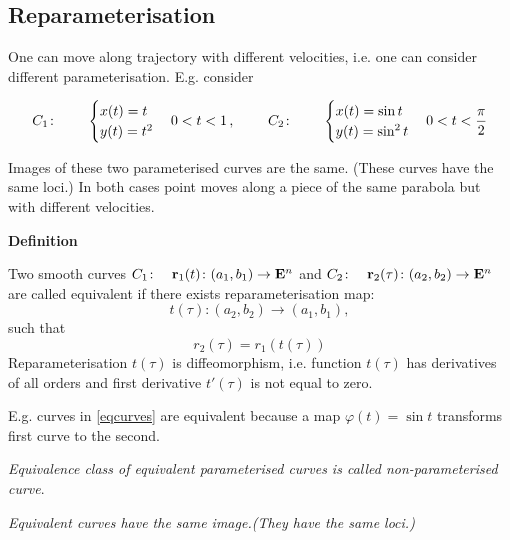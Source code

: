 \documentclass[12pt]{article}
\numberwithin{equation}{section}
\begin{document}
 \subsection {Reparameterisation}

  One can move along trajectory  with different velocities, i.e.
  one can consider different parameterisation. E.g. consider

\begin{equation*}\label{eqcurves}
    C_1\colon\qquad
  \begin{cases}
  x(t)=t\\
  y(t)=t^2\\
  \end{cases}
  0<t<1\,,
 \qquad\
  C_2\colon\qquad
 \begin{cases}
  x(t)=\sin t\\
  y(t)=\sin^2 t\\
  \end{cases}
    0<t<{\pi\over 2}
\end{equation*}

Images of these two  parameterised curves are the same. 
  (These curves have the same loci.)
In both cases point moves
along a piece of the same parabola but with different velocities.

\medskip

{\bf Definition}

  Two smooth curves
  $C_1\colon\quad {\bf r}_1(t)\colon (a_1,b_1)\rightarrow {\bf E}^n$ and
  $C_2\colon\quad {\bf r}_2(\tau)\colon (a_2,b_2)\rightarrow {\bf E}^n$
      are called equivalent if there exists
      reparameterisation map:
                            $$
             t(\tau)\colon (a_2,b_2)\rightarrow (a_1,b_1),
                        $$
                     such that
\begin{equation}\label{repardef}
     r_2(\tau)=r_1(t(\tau))
\end{equation}
Reparameterisation $t(\tau)$ is diffeomorphism, i.e.
function $t(\tau)$ has derivatives of all orders
and first derivative $t'(\tau)$ is not equal to zero.

E.g. curves in \eqref{eqcurves} are equivalent because a map
$\varphi (t)=\sin t$ transforms first curve to the second.

\medskip

 {\it Equivalence class of equivalent parameterised curves 
is called non-parameterised curve}.

   {\it Equivalent curves have the same image.(They have the same loci.)}
\end{document}
